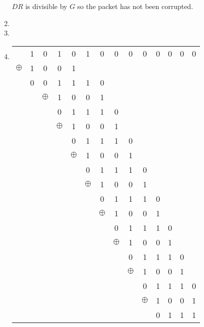 \documentclass[12pt, a4paper]{article}
\begin{document}
\begin{enumerate}[a]
	$DR$ is divisible by $G$ so the packet has not been corrupted.
	\item %
	\item %
	\item %
	\begin{tabular}{cccccccccccccc}
		& 1 & 0 & 1 & 0 & 1 & 0 & 0 & 0 & 0 & 0 & 0 & 0 & 0\\
		$\oplus$ & 1 & 0 & 0 & 1\\\cline{2-5}
		& 0 & 0 & 1 & 1 & 1 & 0\\
		&& $\oplus$ & 1 & 0 & 0 & 1\\\cline{4-7}
		&&& 0 & 1 & 1 & 1 & 0\\
		&&& $\oplus$ & 1 & 0 & 0 & 1\\\cline{5-8}
		&&&& 0 & 1 & 1 & 1 & 0\\
		&&&& $\oplus$ & 1 & 0 & 0 & 1\\\cline{6-9}
		&&&&& 0 & 1 & 1 & 1 & 0\\
		&&&&& $\oplus$ & 1 & 0 & 0 & 1\\\cline{7-10}
		&&&&&& 0 & 1 & 1 & 1 & 0\\
		&&&&&& $\oplus$ & 1 & 0 & 0 & 1\\\cline{8-11}
		&&&&&&& 0 & 1 & 1 & 1 & 0\\
		&&&&&&& $\oplus$ & 1 & 0 & 0 & 1\\\cline{9-12}
		&&&&&&&& 0 & 1 & 1 & 1 & 0\\
		&&&&&&&& $\oplus$ & 1 & 0 & 0 & 1\\\cline{10-13}
		&&&&&&&&& 0 & 1 & 1 & 1 & 0\\
		&&&&&&&&& $\oplus$ & 1 & 0 & 0 & 1\\\cline{11-14}
		&&&&&&&&&& 0 & 1 & 1 & 1\\
	\end{tabular}
\end{enumerate}
\end{document}
